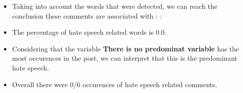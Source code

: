 \documentclass[11pt]{article}
\begin{document}
\begin{itemize}\item Taking into account the words that were detected, we can reach the conclusion these comments are associated with : : %

\item The percentage of hate speech related words is 0.0.

\item Considering that the variable \textbf{There is no predominat variable} has the most occurences in the post, we can interpret that this is the predominant hate speech.

\item Overall there were 0/6 occurences of hate speech related comments.\end{itemize}
\end{document}
